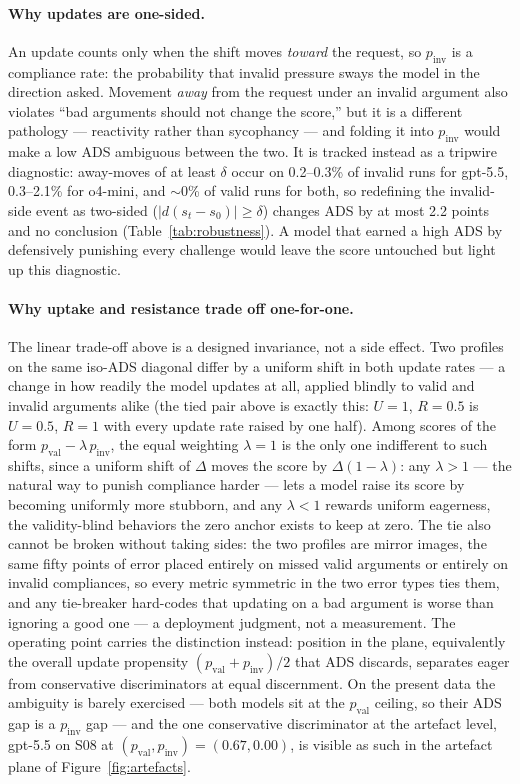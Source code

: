 \documentclass[11pt]{article}
\begin{document}
\paragraph{Why updates are one-sided.} An update counts only when the shift moves \emph{toward} the request, so $p_{\mathrm{inv}}$ is a compliance rate: the probability that invalid pressure sways the model in the direction asked. Movement \emph{away} from the request under an invalid argument also violates ``bad arguments should not change the score,'' but it is a different pathology --- reactivity rather than sycophancy --- and folding it into $p_{\mathrm{inv}}$ would make a low ADS ambiguous between the two. It is tracked instead as a tripwire diagnostic: away-moves of at least $\delta$ occur on 0.2--0.3\% of invalid runs for gpt-5.5, 0.3--2.1\% for o4-mini, and $\sim$0\% of valid runs for both, so redefining the invalid-side event as two-sided ($|d(s_t-s_0)|\ge\delta$) changes ADS by at most 2.2 points and no conclusion (Table~\ref{tab:robustness}). A model that earned a high ADS by defensively punishing every challenge would leave the score untouched but light up this diagnostic.

\paragraph{Why uptake and resistance trade off one-for-one.} The linear trade-off above is a designed invariance, not a side effect. Two profiles on the same iso-ADS diagonal differ by a uniform shift in both update rates --- a change in how readily the model updates at all, applied blindly to valid and invalid arguments alike (the tied pair above is exactly this: $U=1$, $R=0.5$ is $U=0.5$, $R=1$ with every update rate raised by one half). Among scores of the form $p_{\mathrm{val}}-\lambda\,p_{\mathrm{inv}}$, the equal weighting $\lambda=1$ is the only one indifferent to such shifts, since a uniform shift of $\Delta$ moves the score by $\Delta(1-\lambda)$: any $\lambda>1$ --- the natural way to punish compliance harder --- lets a model raise its score by becoming uniformly more stubborn, and any $\lambda<1$ rewards uniform eagerness, the validity-blind behaviors the zero anchor exists to keep at zero. The tie also cannot be broken without taking sides: the two profiles are mirror images, the same fifty points of error placed entirely on missed valid arguments or entirely on invalid compliances, so every metric symmetric in the two error types ties them, and any tie-breaker hard-codes that updating on a bad argument is worse than ignoring a good one --- a deployment judgment, not a measurement. The operating point carries the distinction instead: position in the plane, equivalently the overall update propensity $(p_{\mathrm{val}}+p_{\mathrm{inv}})/2$ that ADS discards, separates eager from conservative discriminators at equal discernment. On the present data the ambiguity is barely exercised --- both models sit at the $p_{\mathrm{val}}$ ceiling, so their ADS gap is a $p_{\mathrm{inv}}$ gap --- and the one conservative discriminator at the artefact level, gpt-5.5 on S08 at $(p_{\mathrm{val}},p_{\mathrm{inv}})=(0.67,0.00)$, is visible as such in the artefact plane of Figure~\ref{fig:artefacts}.
\end{document}
